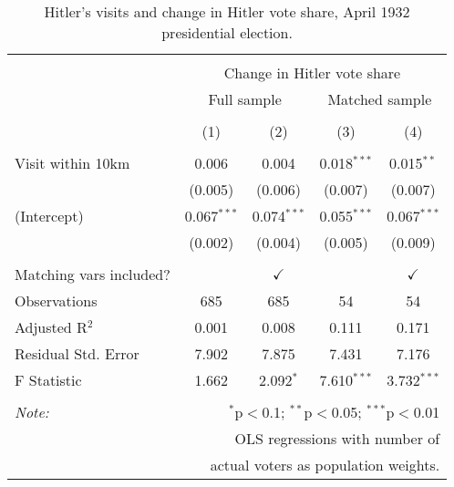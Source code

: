 
\begin{table}[!htbp] \centering 
  \caption{Hitler's visits and change in Hitler vote share, April 1932 presidential election.} 
  \label{tab:ols-pres-voteshare} 
\begin{tabular}{@{\extracolsep{5pt}}lcccc} 
\\[-1.8ex]\hline 
\hline \\[-1.8ex] 
 & \multicolumn{4}{c}{Change in Hitler vote share} \\ 
\cline{2-5} 
 & \multicolumn{2}{c}{Full sample} & \multicolumn{2}{c}{Matched sample} \\ 
\\[-1.8ex] & (1) & (2) & (3) & (4)\\ 
\hline \\[-1.8ex] 
 Visit within 10km & 0.006 & 0.004 & 0.018$^{***}$ & 0.015$^{**}$ \\ 
  & (0.005) & (0.006) & (0.007) & (0.007) \\ 
  (Intercept) & 0.067$^{***}$ & 0.074$^{***}$ & 0.055$^{***}$ & 0.067$^{***}$ \\ 
  & (0.002) & (0.004) & (0.005) & (0.009) \\ 
 \hline \\[-1.8ex] 
Matching vars included? &  & \multicolumn{1}{c}{$\checkmark$} &  & \multicolumn{1}{c}{$\checkmark$} \\ 
Observations & 685 & 685 & 54 & 54 \\ 
Adjusted R$^{2}$ & 0.001 & 0.008 & 0.111 & 0.171 \\ 
Residual Std. Error & 7.902 & 7.875 & 7.431 & 7.176 \\ 
F Statistic & 1.662 & 2.092$^{*}$ & 7.610$^{***}$ & 3.732$^{***}$ \\ 
\hline 
\hline \\[-1.8ex] 
\textit{Note:}  & \multicolumn{4}{r}{$^{*}$p$<$0.1; $^{**}$p$<$0.05; $^{***}$p$<$0.01} \\ 
 & \multicolumn{4}{r}{OLS regressions with number of} \\ 
 & \multicolumn{4}{r}{actual voters as population weights.} \\ 
\end{tabular} 
\end{table} 
